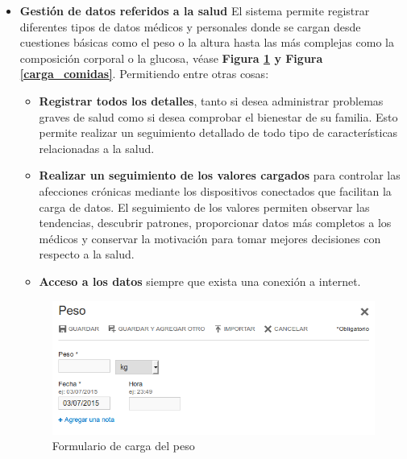 \begin{itemize}
\item \textbf{Gestión de datos referidos a la salud}
	El sistema permite registrar diferentes tipos de datos médicos y personales donde se cargan desde cuestiones básicas como el peso o la altura hasta las más complejas como la composición corporal o la glucosa, véase \textbf{Figura \ref{carga_peso} y Figura \ref{carga_comidas}}.  Permitiendo entre otras cosas:
    \begin{itemize}
		\item \textbf{Registrar todos los detalles}, tanto si desea administrar problemas graves de salud como si desea comprobar el bienestar de su familia. Esto permite realizar un seguimiento detallado de todo tipo de características relacionadas a la salud.
        \item \textbf{Realizar un seguimiento de los valores cargados} para controlar las afecciones crónicas mediante los dispositivos conectados que facilitan la carga de datos. El seguimiento de los valores permiten observar las tendencias, descubrir patrones, proporcionar datos más completos a los médicos y conservar la motivación para tomar mejores decisiones con respecto a la salud.
        \item \textbf{Acceso a los datos} siempre que exista una conexión a internet.
	\end{itemize}
 
 	\begin{figure}[h]
      \centering
      \includegraphics[width=.8\textwidth]{img/tp1/3-carga_peso}
      \caption{Formulario de carga del peso}
      \label{carga_peso}
    \end{figure}   
    

\end{itemize}
